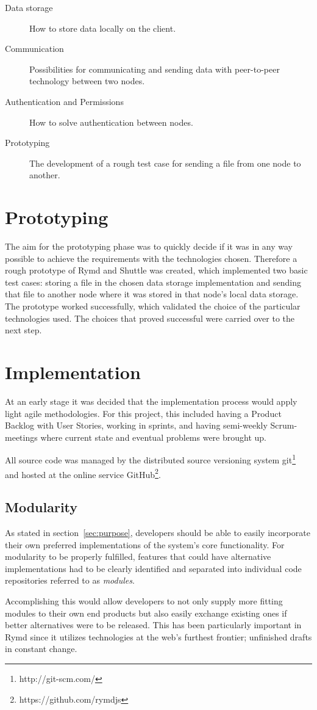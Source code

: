 \begin{description}
\item[Data storage] How to store data locally on the client.
\item[Communication] Possibilities for communicating and sending data with peer-to-peer technology between two nodes.
\item[Authentication and Permissions] How to solve authentication between nodes.
\item[Prototyping] The development of a rough test case for sending a file from one node to another.
\end{description}

\section{Prototyping}

The aim for the prototyping phase was to quickly decide if it was in any way possible to achieve the requirements with the technologies chosen. Therefore a rough prototype of Rymd and Shuttle was created, which implemented two basic test cases: storing a file in the chosen data storage implementation and sending that file to another node where it was stored in that node's local data storage. The prototype worked successfully, which validated the choice of  the particular technologies used. The choices that proved successful were carried over to the next step.

\section{Implementation}

At an early stage it was decided that the implementation process would apply light agile methodologies. For this project, this included having a Product Backlog with User Stories, working in sprints, and having semi-weekly Scrum-meetings where current state and eventual problems were brought up.

All source code was managed by the distributed source versioning system git\footnote{http://git-scm.com/} and hosted at the online service GitHub\footnote{https://github.com/rymdjs}.

\subsection{Modularity}
\label{sec:modularity}

As stated in section~\ref{sec:purpose}, developers should be able to easily incorporate their own preferred implementations of the system's core functionality. For modularity to be properly fulfilled, features that could have alternative implementations had to be clearly identified and separated into individual code repositories referred to as \emph{modules}.

Accomplishing this would allow developers to not only supply more fitting modules to their own end products but also easily exchange existing ones if better alternatives were to be released. This has been particularly important in Rymd since it utilizes technologies at the web's furthest frontier; unfinished drafts in constant change.
